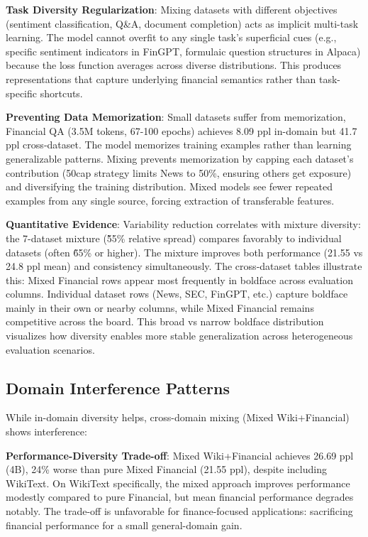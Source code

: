 \textbf{Task Diversity Regularization}: Mixing datasets with different objectives (sentiment classification, Q\&A, document completion) acts as implicit multi-task learning. The model cannot overfit to any single task's superficial cues (e.g., specific sentiment indicators in FinGPT, formulaic question structures in Alpaca) because the loss function averages across diverse distributions. This produces representations that capture underlying financial semantics rather than task-specific shortcuts.

\textbf{Preventing Data Memorization}: Small datasets suffer from memorization, Financial QA (3.5M tokens, 67-100 epochs) achieves 8.09 ppl in-domain but 41.7 ppl cross‑dataset. The model memorizes training examples rather than learning generalizable patterns. Mixing prevents memorization by capping each dataset's contribution (50cap strategy limits News to 50\%, ensuring others get exposure) and diversifying the training distribution. Mixed models see fewer repeated examples from any single source, forcing extraction of transferable features.

\textbf{Quantitative Evidence}: Variability reduction correlates with mixture diversity: the 7-dataset mixture (\~55\% relative spread) compares favorably to individual datasets (often \~65\% or higher). The mixture improves both performance (21.55 vs 24.8 ppl mean) and consistency simultaneously. The cross‑dataset tables illustrate this: Mixed Financial rows appear most frequently in boldface across evaluation columns. Individual dataset rows (News, SEC, FinGPT, etc.) capture boldface mainly in their own or nearby columns, while Mixed Financial remains competitive across the board. This broad vs narrow boldface distribution visualizes how diversity enables more stable generalization across heterogeneous evaluation scenarios.

\subsection{Domain Interference Patterns}

While in-domain diversity helps, cross-domain mixing (Mixed Wiki+Financial) shows interference:

\textbf{Performance-Diversity Trade-off}: Mixed Wiki+Financial achieves 26.69 ppl (4B), 24\% worse than pure Mixed Financial (21.55 ppl), despite including WikiText. On WikiText specifically, the mixed approach improves performance modestly compared to pure Financial, but mean financial performance degrades notably. The trade-off is unfavorable for finance-focused applications: sacrificing financial performance for a small general-domain gain.

